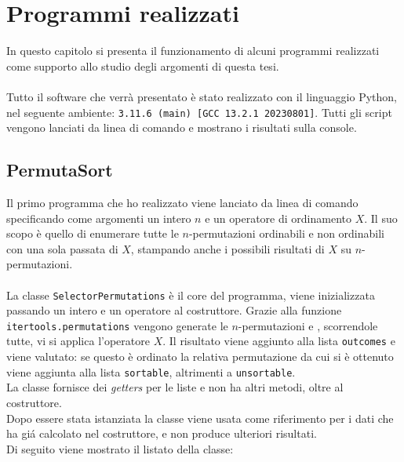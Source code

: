 \chapter{Programmi realizzati}
In questo capitolo si presenta il funzionamento di alcuni programmi realizzati come supporto allo studio degli argomenti di questa tesi.\\\\
Tutto il software che verr\`a presentato \`e stato realizzato con il linguaggio Python, nel seguente ambiente: \texttt{3.11.6 (main) [GCC 13.2.1 20230801]}. Tutti gli script vengono lanciati da linea di comando e mostrano i risultati sulla console.
\section{PermutaSort}
Il primo programma che ho realizzato viene lanciato da linea di comando specificando come argomenti un intero $n$ e un operatore di ordinamento $X$. Il suo scopo \`e quello di enumerare tutte le $n$-permutazioni ordinabili e non ordinabili con una sola passata di $X$, stampando anche i possibili risultati di $X$ su $n$-permutazioni.\\\\
La classe \texttt{SelectorPermutations} \`e il core del programma, viene inizializzata passando un intero e un operatore al costruttore. Grazie alla funzione \texttt{itertools.permutations} vengono generate le $n$-permutazioni e , scorrendole tutte, vi si applica l'operatore $X$. Il risultato viene aggiunto alla lista \texttt{outcomes} e viene valutato: se questo \`e ordinato la relativa permutazione da cui si \`e ottenuto viene aggiunta alla lista \texttt{sortable}, altrimenti a \texttt{unsortable}.\\La classe fornisce dei \textit{getters} per le liste e non ha altri metodi, oltre al costruttore.\\
Dopo essere stata istanziata la classe viene usata come riferimento per i dati che ha gi\'a calcolato nel costruttore, e non produce ulteriori risultati.\\Di seguito viene mostrato il listato della classe:
\\
